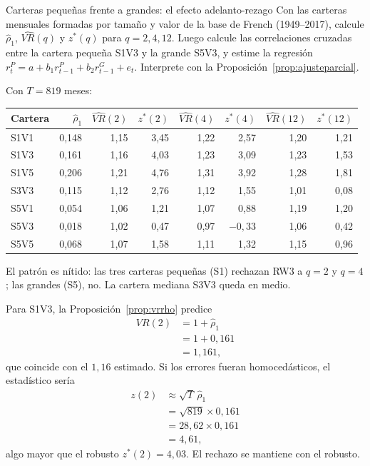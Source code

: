 \begin{ejresuelto}{Carteras pequeñas frente a grandes: el efecto adelanto-rezago}\label{ej:adelanto}
\enunciado Con las carteras mensuales formadas por tamaño y valor de la base de French (1949--2017), calcule
$\hat\rho_1$, $\widehat{VR}(q)$ y $z^*(q)$ para $q=2,4,12$. Luego calcule las correlaciones cruzadas entre la
cartera pequeña S1V3 y la grande S5V3, y estime la regresión
$r^P_t=a+b_1r^P_{t-1}+b_2r^G_{t-1}+e_t$. Interprete con la Proposición~\ref{prop:ajusteparcial}.

\solucion
{} Con $T=819$ meses:
\begin{center}\small
\begin{tabular}{@{}lrrrrrrr@{}}
\toprule
Cartera & $\hat\rho_1$ & $\widehat{VR}(2)$ & $z^*(2)$ & $\widehat{VR}(4)$ & $z^*(4)$ & $\widehat{VR}(12)$ & $z^*(12)$ \\
\midrule
S1V1 & 0,148 & 1,15 & 3,45 & 1,22 & 2,57 & 1,20 & 1,21 \\
S1V3 & 0,161 & 1,16 & 4,03 & 1,23 & 3,09 & 1,23 & 1,53 \\
S1V5 & 0,206 & 1,21 & 4,76 & 1,31 & 3,92 & 1,28 & 1,81 \\
S3V3 & 0,115 & 1,12 & 2,76 & 1,12 & 1,55 & 1,01 & 0,08 \\
S5V1 & 0,054 & 1,06 & 1,21 & 1,07 & 0,88 & 1,19 & 1,20 \\
S5V3 & 0,018 & 1,02 & 0,47 & 0,97 & $-0{,}33$ & 1,06 & 0,42 \\
S5V5 & 0,068 & 1,07 & 1,58 & 1,11 & 1,32 & 1,15 & 0,96 \\
\bottomrule
\end{tabular}
\end{center}
El patrón es nítido: las tres carteras pequeñas (S1) rechazan RW3 a $q=2$ y $q=4$; las grandes (S5), no. La
cartera mediana S3V3 queda en medio.

 Para S1V3, la Proposición~\ref{prop:vrrho} predice
\begin{align*}
  VR(2) &= 1+\hat\rho_1\\
        &= 1+0{,}161\\
        &= 1{,}161,
\end{align*}
que coincide con el $1{,}16$ estimado. Si los errores fueran homocedásticos, el estadístico sería
\begin{align*}
  z(2) &\approx \sqrt T\,\hat\rho_1\\
       &= \sqrt{819}\times0{,}161\\
       &= 28{,}62\times0{,}161\\
       &= 4{,}61,
\end{align*}
algo mayor que el robusto $z^*(2)=4{,}03$. El rechazo se mantiene con el robusto.


\end{ejresuelto}
